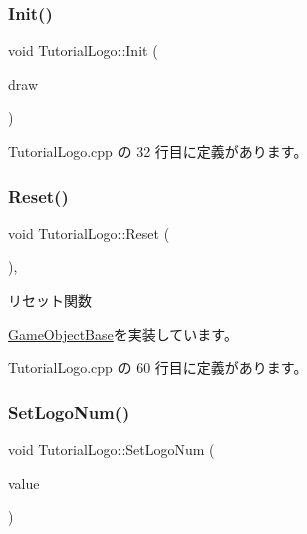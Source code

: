\subsubsection{\texorpdfstring{Init()}{Init()}}
{\footnotesize\ttfamily void Tutorial\+Logo\+::\+Init (\begin{DoxyParamCaption}\item[{\mbox{\hyperlink{class_draw_base}{Draw\+Base}} $\ast$}]{draw }\end{DoxyParamCaption})}



 Tutorial\+Logo.\+cpp の 32 行目に定義があります。

\mbox{\label{class_tutorial_logo_a2c9e22c81cfeafbd34f50cc766a66cf1}} 
\subsubsection{\texorpdfstring{Reset()}{Reset()}}
{\footnotesize\ttfamily void Tutorial\+Logo\+::\+Reset (\begin{DoxyParamCaption}{ }\end{DoxyParamCaption})\hspace{0.3cm}{\ttfamily [override]}, {\ttfamily [virtual]}}



リセット関数 



\mbox{\hyperlink{class_game_object_base_a85c59554f734bcb09f1a1e18d9517dce}{Game\+Object\+Base}}を実装しています。



 Tutorial\+Logo.\+cpp の 60 行目に定義があります。

\mbox{\label{class_tutorial_logo_a18313074bc7242f5e8a9121414abd51d}} 
\subsubsection{\texorpdfstring{Set\+Logo\+Num()}{SetLogoNum()}}
{\footnotesize\ttfamily void Tutorial\+Logo\+::\+Set\+Logo\+Num (\begin{DoxyParamCaption}\item[{unsigned}]{value }\end{DoxyParamCaption})\hspace{0.3cm}{\ttfamily [inline]}}



